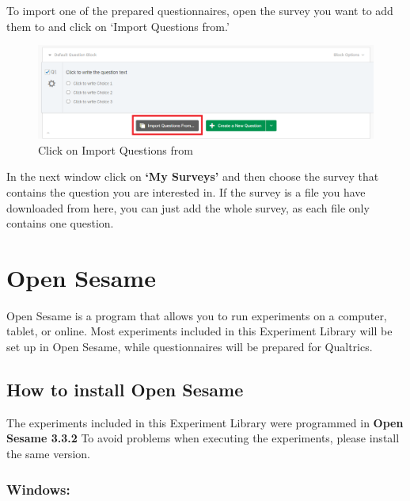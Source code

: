 \documentclass[
]{book}
\begin{document}
To import one of the prepared questionnaires, open the survey you want to add them to and click on `Import Questions from.'

\begin{figure}

{\centering \includegraphics[width=0.85\linewidth]{images/Qualtrics/import} 

}

\caption{Click on Import Questions from}\label{fig:Figure11-16}
\end{figure}

In the next window click on \textbf{`My Surveys'} and then choose the survey that contains the question you are interested in. If the survey is a file you have downloaded from here, you can just add the whole survey, as each file only contains one question.

\hypertarget{open-sesame}{%
\chapter{Open Sesame}\label{open-sesame}}

Open Sesame is a program that allows you to run experiments on a computer, tablet, or online. Most experiments included in this Experiment Library will be set up in Open Sesame, while questionnaires will be prepared for Qualtrics.

\hypertarget{how-to-install-open-sesame}{%
\section{How to install Open Sesame}\label{how-to-install-open-sesame}}

The experiments included in this Experiment Library were programmed in \textbf{Open Sesame 3.3.2} To avoid problems when executing the experiments, please install the same version.

\hypertarget{windows}{%
\subsection{Windows:}\label{windows}}
\end{document}

